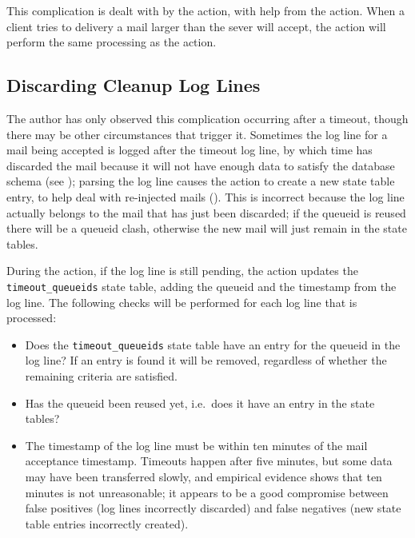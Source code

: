 This complication is dealt with by the  action, with help
from the  action.  When a client tries to delivery a mail
larger than the sever will accept, the  action
will perform the same processing as the  action.

\subsection{Discarding Cleanup Log Lines}

\label{discarding cleanup log lines}

The author has only observed this complication occurring after a timeout,
though there may be other circumstances that trigger it.  Sometimes the
 log line for a mail being accepted is logged after the
timeout log line, by which time \parsername{} has discarded the mail
because it will not have enough data to satisfy the database schema (see
); parsing the  log
line causes the  action to create a new state
table entry, to help deal with re-injected mails ().  This is incorrect because the log line actually belongs to the
mail that has just been discarded; if the queueid is reused there will be a
queueid clash, otherwise the new mail will just remain in the state tables.

During the  action, if the  log line is
still pending, the action updates the \texttt{timeout\_queueids} state
table, adding the queueid and the timestamp from the log line.  The
following checks will be performed for each  log line
that is processed:

\begin{itemize}

    \item Does the \texttt{timeout\_queueids} state table have an entry for
        the queueid in the log line?  If an entry is found it will be
        removed, regardless of whether the remaining criteria are
        satisfied.

    \item Has the queueid been reused yet, i.e.\ does it have an entry in
        the state tables?

    \item The timestamp of the  log line must be within ten
        minutes of the mail acceptance timestamp.  Timeouts happen after
        five minutes, but some data may have been transferred slowly, and
        empirical evidence shows that ten minutes is not unreasonable; it
        appears to be a good compromise between false positives (log lines
        incorrectly discarded) and false negatives (new state table entries
        incorrectly created).

\end{itemize}

